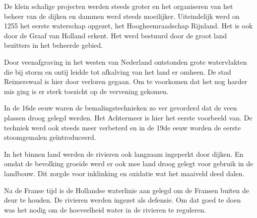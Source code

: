 De klein schalige projecten werden steeds groter en het organiseren van het beheer van de dijken en dammen werd steeds moeilijker.
Uiteindelijk werd on 1255 het eerste waterschap opgezet, het Hoogheemraadschap Rijnland.
Het is ook door de Graaf van Holland erkent.
Het werd bestuurd door de groot land bezitters in het beheerde gebied.

Door veenafgraving in het westen van Nederland ontstonden grote watervlakten die bij storm en ontij leidde tot afkalving van het land er omheen.
De stad Reimerswaal is hier door verloren gegaan.
Om te voorkomen dat het nog harder mis ging is er sterk toezicht op de vervening gekomen.

In de 16de eeuw waren de bemalingstechnieken zo ver gevorderd dat de veen plassen droog gelegd werden.
Het Achtermeer is hier het eerste voorbeeld van.
De techniek werd ook steeds meer verbeterd en in de 19de eeuw worden de eerste stoomgemalen geïntroduceerd.

In het binnen land werden de rivieren ook langzaam ingeperkt door dijken.
En omdat de bevolking groeide werd er ook mee land droog gelegt voor gebruik in de landbouw.
Dit zorgde voor inklinking en oxidatie wat het maaiveld deed dalen.

Na de Franse tijd is de Hollandse waterlinie aan gelegd om de Fransen buiten de deur te houden.
De rivieren werden ingezet als defensie.
Om dat goed te doen was het nodig om de hoeveelheid water in de rivieren te reguleren.

